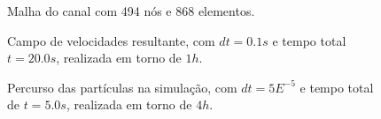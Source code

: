 \documentclass{beamer}
\begin{document}
\begin{frame}
  \frametitle{\subsecname}
  
  \begin{figure}
     {\raggedleft \tiny Malha do canal com 494 nós e 868 elementos.}
  \end{figure}
  \vspace*{-\baselineskip}\setlength\belowdisplayshortskip{0pt} %
  \begin{figure}
     {\raggedleft \tiny Campo de velocidades resultante, com $dt=0.1s$ e tempo total $t=20.0s$, realizada em torno de $1h$.}
  \end{figure}
  \vspace*{-\baselineskip}\setlength\belowdisplayshortskip{0pt} %
  \begin{figure}
     {\raggedleft \tiny Percurso das partículas na simulação, com $dt=5E^{-5}$ e tempo total de $t=5.0s$, realizada em torno de $4h$.}
  \end{figure}
\end{frame}

\end{document}
